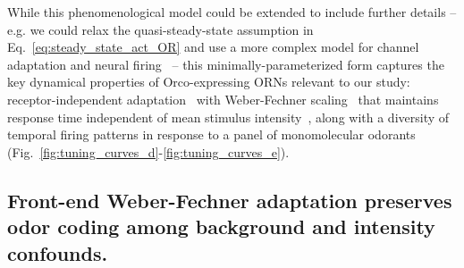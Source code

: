 \documentclass[10pt,prl,aps,showpacs,twocolumn,unsortedaddress,showkeys,linenumbers]{revtex4-1}
\begin{document}
While this phenomenological model could be extended to include further details -- e.g. we could relax the quasi-steady-state assumption in Eq.~\ref{eq:steady_state_act_OR} and use a more complex model for channel adaptation and neural firing~\cite{srinivas_elife} -- this minimally-parameterized form captures the key dynamical properties of Orco-expressing ORNs relevant to our study: receptor-independent adaptation~\cite{nagel_wilson_biophysical} with Weber-Fechner scaling~\cite{srinivas_elife, cafaro_WL,cao_WL} that maintains response time independent of mean stimulus intensity~\cite{martelli,srinivas_elife}, along with a diversity of temporal firing patterns in response to a panel of monomolecular odorants~\cite{hallem_carlson, montague2011similar, stopfer_nat_neuro, stopfer_temporal_channel, stopfer_temporal_model} (Fig.~\ref{fig:tuning_curves_d}-\ref{fig:tuning_curves_e}).


 







\subsection*{Front-end Weber-Fechner adaptation preserves odor coding among background and intensity confounds.}
\end{document}
